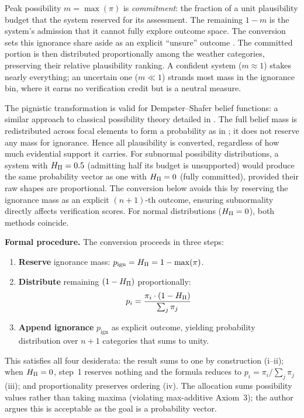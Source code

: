 Peak possibility $m = \max(\pi)$ is \textit{commitment}: the
fraction of a unit plausibility budget that the system reserved for
its assessment. The remaining $1 - m$ is the
system's admission that it cannot fully explore outcome space.
The conversion sets this ignorance share aside
as an explicit ``unsure'' outcome \citep{Lawson2024-jc}.
The committed portion is then distributed
proportionally among the weather categories,
preserving their relative plausibility ranking.
A confident system ($m \approx 1$) stakes nearly
everything;
an uncertain one ($m \ll 1$) strands most mass
in the ignorance bin,
where it earns no verification credit but is a
neutral measure.

The pignistic
transformation \citep{Smets1990-nf,Sudano2015-rk} is valid for
Dempster--Shafer belief functions:
a similar approach to classical possibility
theory detailed in \citet{Yager2005-at}.
The full belief mass is redistributed across
focal elements to form a probability as
in \citet{Le_Carrer2021-by};
it does not reserve any mass for ignorance.
Hence all plausibility is converted,
regardless of how much evidential support it
carries.
For subnormal possibility distributions,
a system with $H_{\Pi} = 0.5$ (admitting half its
budget is unsupported) would produce the same
probability vector as one with $H_{\Pi} = 0$
(fully committed),
provided their raw shapes are proportional.
The conversion below avoids this by reserving
the ignorance mass as an explicit
$(n{+}1)$-th outcome,
ensuring subnormality directly affects
verification scores.
For normal distributions ($H_{\Pi} = 0$),
both methods coincide.

\textbf{Formal procedure.} The conversion
proceeds in three steps:
\begin{enumerate}[leftmargin=2em]
\item \textbf{Reserve} ignorance mass:
    $p_{\mathrm{ign}} = H_{\Pi} = 1 - \max(\pi)$.
\item \textbf{Distribute} remaining $(1 - H_{\Pi})$ proportionally:
    \[
    p_i = \frac{\pi_i \cdot (1 - H_{\Pi})}{\sum_j \pi_j}
    \]
\item \textbf{Append ignorance} $p_{\mathrm{ign}}$ as explicit
    outcome, yielding probability distribution over $n+1$
    categories that sums to unity.
\end{enumerate}

This satisfies all four desiderata: the result sums to one by
construction (i--ii); when $H_{\Pi} = 0$, step~1 reserves nothing and the
formula reduces to $p_i = \pi_i / \sum_j\pi_j$ (iii); and
proportionality preserves ordering (iv).
The allocation sums possibility values rather than taking
maxima (violating max-additive Axiom~3); the author argues this is
acceptable as the goal is a probability vector.

